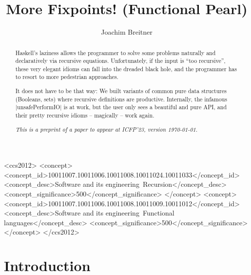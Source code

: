 \documentclass[manuscript,screen,acmsmall,nonacm]{acmart}
\begin{document}
\title{More Fixpoints! (Functional Pearl)}

\author{Joachim Breitner}


\begin{abstract}
Haskell’s laziness allows the programmer to solve some problems naturally and declaratively via recursive equations. Unfortunately, if the input is “too recursive”, these very elegant idioms can fall into the dreaded black hole, and the programmer has to resort to more pedestrian approaches.

It does not have to be that way: We built variants of common pure data structures (Booleans, sets) where recursive definitions are productive. Internally, the infamous |unsafePerformIO| is at work, but the user only sees a beautiful and pure API, and their pretty recursive idioms -- magically -- work again.

\ifpreprint
\emph{This is a preprint of a paper to appear at ICFP'23, version \today.}
\fi
\end{abstract}

\begin{CCSXML}
<ccs2012>
   <concept>
       <concept_id>10011007.10011006.10011008.10011024.10011033</concept_id>
       <concept_desc>Software and its engineering~Recursion</concept_desc>
       <concept_significance>500</concept_significance>
       </concept>
   <concept>
       <concept_id>10011007.10011006.10011008.10011009.10011012</concept_id>
       <concept_desc>Software and its engineering~Functional languages</concept_desc>
       <concept_significance>500</concept_significance>
       </concept>
 </ccs2012>
\end{CCSXML}



\maketitle

\section{Introduction}
\end{document}
